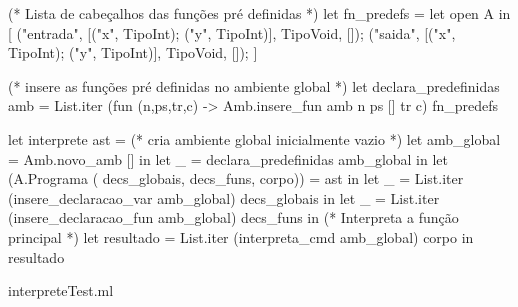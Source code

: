 \documentclass[12pt,a4paper,twoside]{article}
\begin{document}
\begin{terminal}
(* Lista de cabeçalhos das funções pré definidas *)
let fn_predefs = let open A in [
    ("entrada", [("x", TipoInt); ("y", TipoInt)], TipoVoid, []);
    ("saida",     [("x", TipoInt); ("y", TipoInt)], TipoVoid, []);
]

(* insere as funções pré definidas no ambiente global *)
let declara_predefinidas amb =
  List.iter (fun (n,ps,tr,c) -> Amb.insere_fun amb n ps [] tr c) fn_predefs

let interprete ast =
  (* cria ambiente global inicialmente vazio *)
  let amb_global = Amb.novo_amb [] in
  let _ = declara_predefinidas amb_global in
  let (A.Programa ( decs_globais, decs_funs, corpo)) = ast in
  let _ = List.iter (insere_declaracao_var amb_global) decs_globais in
  let _ = List.iter (insere_declaracao_fun amb_global) decs_funs in
  (* Interpreta a função principal *)
  let resultado = List.iter (interpreta_cmd amb_global) corpo in
  resultado

\end{terminal}
interpreteTest.ml
\end{document}
